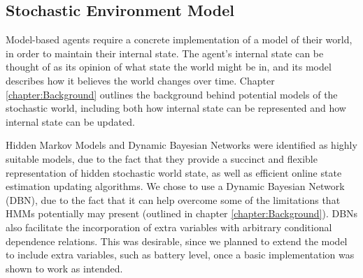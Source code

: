 

\subsection{Stochastic Environment Model}
\workinprogress
Model-based agents require a concrete implementation of a model of their world, in order to maintain their internal state. The agent's internal state can be thought of as its opinion of what state the world might be in, and its model describes how it believes the world changes over time. Chapter \ref{chapter:Background} outlines the background behind potential models of the stochastic world, including both how internal state can be represented and how internal state can be updated.\par
Hidden Markov Models and Dynamic Bayesian Networks were identified as highly suitable models, due to the fact that they provide a succinct and flexible representation of hidden stochastic world state, as well as efficient online state estimation updating algorithms. We chose to use a Dynamic Bayesian Network (DBN), due to the fact that it can help overcome some of the limitations that HMMs potentially may present (outlined in chapter \ref{chapter:Background}). DBNs also facilitate the incorporation of extra variables with arbitrary conditional dependence relations. This was desirable, since we planned to extend the model to include extra variables, such as battery level, once a basic implementation was shown to work as intended.


